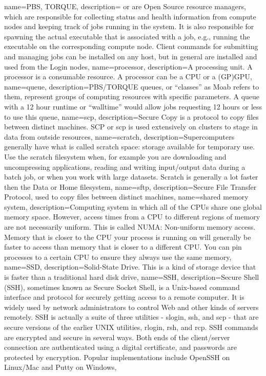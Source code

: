 {
  name={PBS, TORQUE},
  description={ or  are Open Source resource managers, which are responsible for collecting status and health information from compute nodes and keeping track of jobs running in the system. It is also responsible for spawning the actual executable that is associated with a job, e.g., running the executable on the corresponding compute node. Client commands for submitting and managing jobs can be installed on any host, but in general are installed and used from the Login nodes},
}
{
  name={processor},
  description={A processing unit. A processor is a consumable resource. A processor can be a CPU or a (GP)GPU},
}
{
  name={queue},
  description={PBS/TORQUE queues, or ``classes'' as Moab refers to them, represent groups of computing resources with specific parameters. A queue with a 12 hour runtime or ``walltime'' would allow jobs requesting 12 hours or less to use this queue},
}
{
  name={scp},
  description={Secure Copy is a protocol to copy files between distinct machines. SCP or scp is used extensively on \hpc clusters to stage in data from outside resources},
}
{
  name={scratch},
  description={Supercomputers generally have what is called scratch space: storage available for temporary use. Use the scratch filesystem when, for example you are downloading and uncompressing applications, reading and writing input/output data during a batch job, or when you work with large datasets. Scratch is generally a lot faster then the Data or Home filesystem},
}
{
  name={sftp},
  description={Secure File Transfer Protocol, used to copy files between distinct machines},
}
{
  name={shared memory system},
  description={Computing system in which all of the CPUs share one global memory space. However, access times from a CPU to different regions of memory are not necessarily uniform. This is called NUMA: Non-uniform memory access. Memory that is closer to the CPU your process is running on will generally be faster to access than memory that is closer to a different CPU. You can pin processes to a certain CPU to ensure they always use the same memory},
}
{
  name={SSD},
  description={Solid-State Drive. This is a kind of storage device that is faster than a traditional hard disk drive},
}
{
  name={SSH},
  description={Secure Shell (SSH), sometimes known as Secure Socket Shell, is a Unix-based command interface and protocol for securely getting access to a remote computer. It is widely used by network administrators to control Web and other kinds of servers remotely. SSH is actually a suite of three utilities - slogin, ssh, and scp - that are secure versions of the earlier UNIX utilities, rlogin, rsh, and rcp. SSH commands are encrypted and secure in several ways. Both ends of the client/server connection are authenticated using a digital certificate, and passwords are protected by encryption. Popular implementations include OpenSSH on Linux/Mac and Putty on Windows},
}
